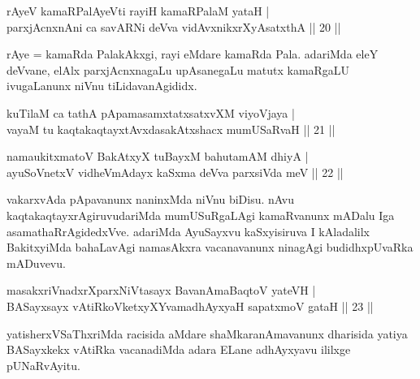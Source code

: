 
\begin{shl}
rAyeV kamaRPalAyeVti rayiH kamaRPalaM yataH | \\
parxjAcnxnAni ca savARNi deVva vidAvxnikxrXyAsatxthA \hfill||  20 ||
\end{shl}

\begin{artha} 
rAye = kamaRda PalakAkxgi, rayi eMdare kamaRda Pala. adariMda eleY 
deVvane, elAlx parxjAcnxnagaLu upAsanegaLu matutx kamaRgaLU 
ivugaLanunx niVnu tiLidavanAgididx.
\end{artha}

\begin{shl}
kuTilaM ca tathA pApamasamxtatxsatxvXM viyoVjaya | \\
vayaM tu kaqtakaqtayxtAvxdasakAtxshacx mumUSaRvaH \hfill||  21 || 
\end{shl}

\begin{shl}
namaukitxmatoV BakAtxyX tuBayxM bahutamAM dhiyA | \\
ayuSoV\s netxV vidheVmAdayx kaSxma deVva parxsiVda meV \hfill||  22 || 
\end{shl}

\begin{artha} 
vakarxvAda pApavanunx naninxMda niVnu biDisu. nAvu 
kaqtakaqtayxrAgiruvudariMda mumUSuRgaLAgi kamaRvanunx mADalu Iga 
asamathaRrAgidedxVve. adariMda AyuSayxvu kaSxyisiruva I kAladalilx 
BakitxyiMda bahaLavAgi namasAkxra vacanavanunx ninagAgi budidhxpUvaRka 
mADuvevu.
\end{artha}


\begin{shl}
masakxriVnadxrXparxNiVtasayx BavanAmaBaqtoV yateVH | \\
BASayxsayx vAtiRkoVketxyXYvamadhAyxyaH sapatxmoV gataH \hfill||  23 || 
\end{shl}

\begin{artha} 
yatisherxVSaThxriMda racisida aMdare shaMkaranAmavanunx 
dharisida yatiya BASayxkekx vAtiRka vacanadiMda adara ELane adhAyxyavu 
ililxge pUNaRvAyitu.
\end{artha}

\centerline{}

\newpage

